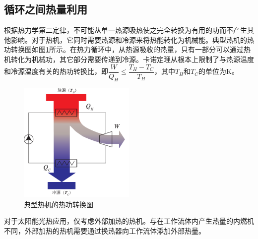 \subsection{循环之间热量利用}
\label{sec:HRBC}

根据热力学第二定律，不可能从单一热源吸热使之完全转换为有用的功而不产生其他影响。对于热机，它同时需要热源和冷源来将热能转化为机械能。典型热机的热功转换图如图\ref{fig:engines}所示。在热力循环中，从热源吸收的热量，只有一部分可以通过热机转化为机械功，其它部分需要传递到冷源。卡诺定理从根本上限制了与热源温度和冷源温度有关的热功转换比，即$\dfrac{W}{Q_H} \leqslant \dfrac{T_H - T_C}{T_H}$，其中$T_H$和$T_C$的单位为$\mathrm{K}$。

\begin{figure}[h]
\centering 
\includegraphics[width=0.5\textwidth]{fig/engines}
\caption{典型热机的热功转换图}\label{fig:engines}
\end{figure}

对于太阳能光热应用，仅考虑外部加热的热机。与在工作流体内产生热量的内燃机不同，外部加热的热机需要通过换热器向工作流体添加外部热量。

